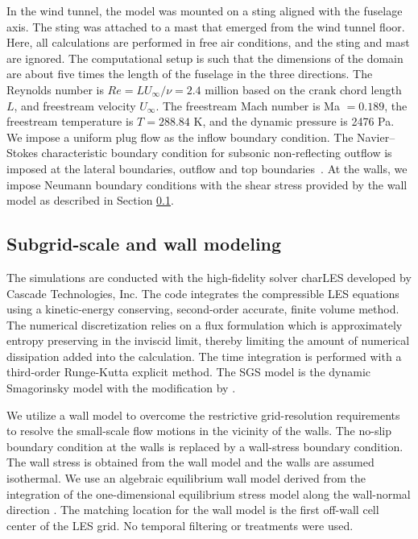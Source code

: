 \documentclass{ctr}
\begin{document}
In the wind tunnel, the model was mounted on a sting aligned with the
fuselage axis.  The sting was attached to a mast that emerged from the
wind tunnel floor. Here, all calculations are performed in free air
conditions, and the sting and mast are ignored. The computational
setup is such that the dimensions of the domain are about five times the
length of the fuselage  in the three directions. The Reynolds number is
$Re = L U_\infty/\nu=2.4$ million based on the crank chord length $L$,
and freestream velocity $U_\infty$. The freestream Mach number is Ma
$= 0.189$, the freestream temperature is $T = 288.84$ K, and the dynamic
pressure is 2476 Pa.  We impose a uniform plug flow as the inflow
boundary condition. The Navier--Stokes characteristic boundary
condition for subsonic non-reflecting outflow is imposed at the
lateral boundaries, outflow and top boundaries~\citep{Poinsot1992}.  At
the walls, we impose Neumann boundary conditions with the shear stress
provided by the wall model as described in Section \ref{sec:models}.
%

\subsection{Subgrid-scale and wall modeling}\label{sec:models}

The simulations are conducted with the high-fidelity solver charLES
developed by Cascade Technologies, Inc. The code integrates the
compressible LES equations using a kinetic-energy conserving,
second-order accurate, finite volume method. The numerical
discretization relies on a flux formulation which is approximately
entropy preserving in the inviscid limit, thereby limiting the amount
of numerical dissipation added into the calculation. The time
integration is performed with a third-order Runge-Kutta explicit
method. The SGS model is the dynamic Smagorinsky model
\citep{Germano1991} with the modification by \cite{Lilly1992}.

We utilize a wall model to overcome the restrictive grid-resolution
requirements to resolve the small-scale flow motions in the vicinity
of the walls. The no-slip boundary condition at the walls is replaced
by a wall-stress boundary condition.  The wall stress is obtained from
the wall model and the walls are assumed isothermal. We use an
algebraic equilibrium wall model derived from the integration of the
one-dimensional equilibrium stress model along the wall-normal
direction \citep{Wang2002, Kawai2012, Larsson2015}. The matching
location for the wall model is the first off-wall cell center of the
LES grid. No temporal filtering or treatments were used.
\end{document}
